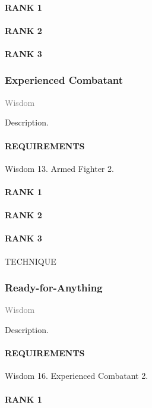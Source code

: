 \paragraph{RANK 1} %
\paragraph{RANK 2} 
\paragraph{RANK 3} 

\subsubsection{Experienced Combatant} \label{tal::experiencedcombatant} %
\small{\textcolor{gray}{Wisdom}}

\normalsize
Description.
\paragraph{REQUIREMENTS} Wisdom 13. Armed Fighter 2.
\paragraph{RANK 1} 
\paragraph{RANK 2} 
\paragraph{RANK 3} TECHNIQUE

\subsubsection{Ready-for-Anything} \label{tal::readyforanything} %
\small{\textcolor{gray}{Wisdom}}

\normalsize
Description.
\paragraph{REQUIREMENTS} Wisdom 16. Experienced Combatant 2.
\paragraph{RANK 1} 

